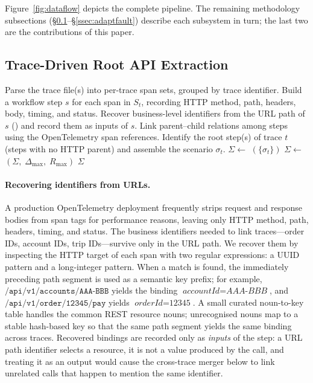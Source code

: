 \documentclass[conference]{IEEEtran}
\begin{document}
\noindent%
Figure~\ref{fig:dataflow} depicts the complete pipeline. The remaining methodology subsections (\S\ref{ssec:extract}--\S\ref{ssec:adaptfault}) describe each subsystem in turn; the last two are the contributions of this paper.

\subsection{Trace-Driven Root API Extraction}
\label{ssec:extract}
\begin{algorithm}[tb]
\caption{Trace workflow extraction}\label{alg:extract}
\footnotesize
\begin{algorithmic}[1]
\Require{}
\Ensure{}
\State Parse the trace file(s) into per-trace span sets, grouped by trace identifier.
    \State Build a workflow step $s$ for each span in $S_t$, recording HTTP method, path, headers, body, timing, and status.
    \State Recover business-level identifiers from the URL path of $s$ () and record them as inputs of $s$.
    \State Link parent--child relations among steps using the OpenTelemetry span references.
    \State Identify the root step(s) of trace $t$ (steps with no HTTP parent) and assemble the scenario $\sigma_t$.
\EndFor
\State $\Sigma \gets$ $(\{\sigma_t\})$ 
\State $\Sigma \gets$ $(\Sigma,\;\Delta_{\max},\;R_{\max})$ 
\State \Return $\Sigma$
\end{algorithmic}
\end{algorithm}

\paragraph{Recovering identifiers from URLs.}
A production OpenTelemetry deployment frequently strips request and response bodies from span tags for performance reasons, leaving only HTTP method, path, headers, timing, and status. The business identifiers needed to link traces---order IDs, account IDs, trip IDs---survive only in the URL path. We recover them by inspecting the HTTP target of each span with two regular expressions: a UUID pattern and a long-integer pattern. When a match is found, the immediately preceding path segment is used as a semantic key prefix; for example, $\texttt{/api/v1/accounts/AAA-BBB}$ yields the binding $\textit{accountId}{=}\textit{AAA-BBB}$, and $\texttt{/api/v1/order/12345/pay}$ yields $\textit{orderId}{=}\textit{12345}$. A small curated noun-to-key table handles the common REST resource nouns; unrecognised nouns map to a stable hash-based key so that the same path segment yields the same binding across traces. Recovered bindings are recorded only as \emph{inputs} of the step: a URL path identifier selects a resource, it is not a value produced by the call, and treating it as an output would cause the cross-trace merger below to link unrelated calls that happen to mention the same identifier.
\end{document}
